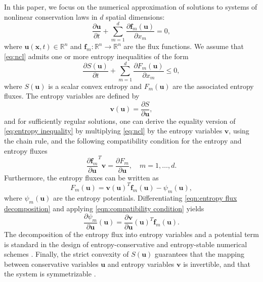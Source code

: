 \documentclass{elsarticle}
\theoremstyle{definition}
\theoremstyle{plain}
\theoremstyle{plain}
\newcommand{\refone}[1]{{\color{red}#1}}
\newcommand{\reftwo}[1]{{\color{blue}#1}}
\renewcommand{\refone}[1]{#1}
\renewcommand{\reftwo}[1]{#1}
\begin{document}
In this paper, we focus on the numerical approximation of solutions to systems of nonlinear conservation laws in $d$ spatial dimensions:
\begin{equation}
 \frac{ \partial \bm{u}}{\partial t} + \sum_{m=1}^d  \frac{\partial \bm{f}_m(\bm{u})}{\partial x_{m}} = 0,
\label{eq:ncl}
\end{equation}
where $\bm{u}(\bm{x},t) \in \mathbb{R}^n$ and $\bm{f}_m : \mathbb{R}^n \to \mathbb{R}^n$ are the flux functions. We assume that \eqref{eq:ncl} admits one or more entropy inequalities of the form
\begin{equation}
\frac{\partial S(\bm{u}) }{\partial t}+ \sum_{m=1}^d  \frac{ \partial F_m(\bm{u})}{\partial x_{m}} \le 0,
\label{eq:entropy inequality}
\end{equation}
where $S(\bm{u})$ is a scalar convex entropy and $F_m(\bm{u})$ are the associated entropy fluxes. The entropy variables are defined by 
\[ 
\bm{v}(\bm{u}) = \frac{\partial S}{\partial \bm{u}},
\]
and for sufficiently regular solutions, one can derive the equality version of \eqref{eq:entropy inequality} by multiplying \eqref{eq:ncl} by the entropy variables $\bm{v}$, using the chain rule, and the following compatibility condition for the entropy and entropy fluxes
\begin{equation}\label{eqn:compatibility condition}
\refone{\frac{\partial \bm{f}_m}{\partial \bm{u}}^T \bm{v}} = \frac{\partial F_m}{\partial \bm{u}}, \quad m = 1,\dots,d.
\end{equation}
Furthermore, the entropy fluxes can be written as
\begin{equation}\label{eqn:entropy flux decomposition}
F_m(\bm{u}) = \bm{v}(\bm{u})^T \bm{f}_m(\bm{u}) - \psi_m(\bm{u}), 
\end{equation}
where $\psi_m(\bm{u})$ are the entropy potentials. Differentiating \eqref{eqn:entropy flux decomposition} and applying \eqref{eqn:compatibility condition} yields
\begin{equation}
\frac{\partial \psi_m}{\partial \bm{u}}(\bm{u}) = 
\frac{\partial \bm{v}}{\partial \bm{u}}(\bm{u})^T \bm{f}_m(\bm{u}).
\label{eq:dpsi_rule}
\end{equation} 
The decomposition of the entropy flux into entropy variables and a potential term is standard in the design of entropy-conservative and entropy-stable numerical schemes \reftwo{\cite{ godunov1961, harten1983symmetric, lax1973hyperbolic, leveque2002finite, tadmor2003entropy}}. Finally, the \reftwo{strict} convexity of $S(\bm{u})$ guarantees that the mapping between conservative variables $\bm{u}$ and entropy variables $\bm{v}$ is invertible, and that the system is symmetrizable \cite{dafermos2005hyperbolic, friedrichs1971systems, lukavcova2025note}.
\end{document}
